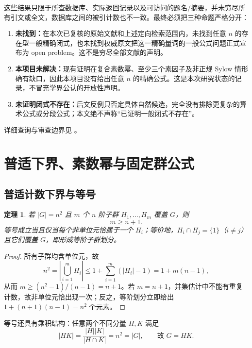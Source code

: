 \documentclass[11pt,a4paper]{article}
\numberwithin{equation}{section}
\theoremstyle{plain}
\newtheorem{theorem}{定理}[section]
\theoremstyle{definition}
\theoremstyle{remark}
\begin{document}
这些结果只限于所查数据库、实际返回记录以及可访问的题名/摘要，并未穷尽所有引文或全文，数据库之间的被引计数也不一致。最终必须把三种命题严格分开：
\begin{enumerate}[label=\textup{(\arabic*)},leftmargin=2.6em]
 \item \textbf{未找到：}在本次已复核的原始文献和上述定向检索范围内，未找到任意 $n$ 的存在型一般精确闭式，也未找到权威原文把这一精确量词的一般公式问题正式宣布为 open problem。这不是穷尽全部文献的声明。
 \item \textbf{本项目未解决：}现有证明在复合素数幂、至少三个素因子及非正规 Sylow 情形确有缺口，因此本项目没有给出任意 $n$ 的精确公式。这是本次研究状态的记录，不冒充学界公认的开放性声明。
 \item \textbf{未证明闭式不存在：}后文反例只否定具体自然候选，完全没有排除更复杂的算术公式或分段公式；本文绝不声称“已证明一般闭式不存在”。
\end{enumerate}
详细查询与审查边界见 。

\section{普适下界、素数幂与固定群公式}
\subsection{普适计数下界与等号}
\begin{theorem}\label{thm:counting}
若 $|G|=n^2$ 且 $m$ 个 $n$ 阶子群 $H_1,\dots,H_m$ 覆盖 $G$，则
\begin{equation}\label{eq:counting}
 m\ge n+1.
\end{equation}
等号成立当且仅当每个非单位元恰属于一个 $H_i$；等价地，$H_i\cap H_j=\{1\}$（$i\ne j$）且它们覆盖 $G$，即形成等阶子群划分。
\end{theorem}
\begin{proof}
所有子群均含单位元，故
\begin{equation}
 n^2=\left|\bigcup_{i=1}^mH_i\right|
 \le 1+\sum_{i=1}^m(|H_i|-1)=1+m(n-1),
\end{equation}
从而 $m\ge(n^2-1)/(n-1)=n+1$。若 $m=n+1$，并集估计中不能有重复计数，故非单位元恰出现一次；反之，等阶划分立即给出 $1+(n+1)(n-1)=n^2$ 个元素。
\end{proof}

等号还具有乘积结构：任意两个不同分量 $H,K$ 满足
\begin{equation}
 |HK|=\frac{|H||K|}{|H\cap K|}=n^2=|G|,
 \qquad\text{故 }G=HK.
\end{equation}
\end{document}
